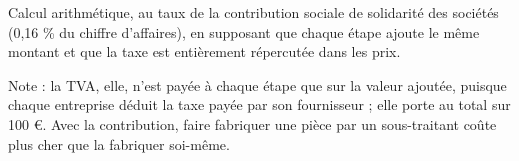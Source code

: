 Calcul arithmétique, au taux de la contribution sociale de solidarité des sociétés (0,16 \% du chiffre d'affaires), en supposant que chaque étape ajoute le même montant et que la taxe est entièrement répercutée dans les prix.\par Note : la TVA, elle, n'est payée à chaque étape que sur la valeur ajoutée, puisque chaque entreprise déduit la taxe payée par son fournisseur ; elle porte au total sur 100 \euro{}. Avec la contribution, faire fabriquer une pièce par un sous-traitant coûte plus cher que la fabriquer soi-même.
